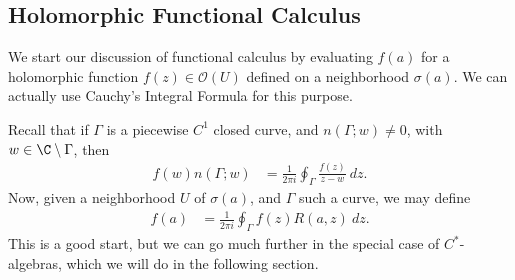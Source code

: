 \documentclass[10pt]{mypackage}
\begin{document}
\subsection{Holomorphic Functional Calculus}%
We start our discussion of functional calculus by evaluating $f(a)$ for a holomorphic function $f(z)\in \mathcal{O}(U)$ defined on a neighborhood $\sigma(a)$. We can actually use Cauchy's Integral Formula for this purpose.

Recall that if $\Gamma$ is a piecewise $C^1$ closed curve, and $n\left( \Gamma;w \right)\neq 0$, with $w\in \C\setminus \Gamma$, then
\begin{align*}
  f(w)n\left( \Gamma;w \right) &= \frac{1}{2\pi i} \oint_{\Gamma}^{} \frac{f(z)}{z-w}\:dz.
\end{align*}
Now, given a neighborhood $U$ of $\sigma(a)$, and $\Gamma$ such a curve, we may define
\begin{align*}
  f(a) &= \frac{1}{2\pi i} \oint_{\Gamma}^{} f(z)R\left( a,z \right)\:dz.
\end{align*}
This is a good start, but we can go much further in the special case of $C^{\ast}$-algebras, which we will do in the following section.
\end{document}
